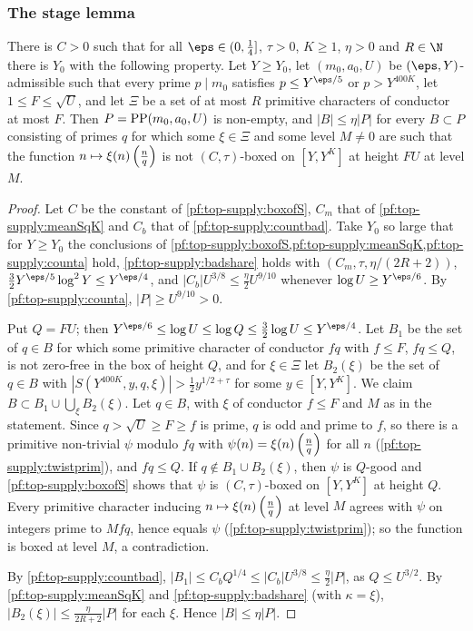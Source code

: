 \subsubsection{The stage lemma}

\begin{proposition}\label{pf:top-supply:stage}
There is $C>0$ such that for all $\eps\in(0,\frac14]$, $\tau>0$, $K\ge1$, $\eta>0$ and $R\in\N$ there is $Y_0$ with the
following property. Let $Y\ge Y_0$, let $(m_0,a_0,U)$ be $(\eps,Y)$-admissible such that every prime $p\mid m_0$
satisfies $p\le Y^{\eps/5}$ or $p>Y^{400K}$, let $1\le F\le\sqrt U$, and let $\Xi$ be a set of at most $R$ primitive
characters of conductor at most $F$. Then $P=\operatorname{PP}(m_0,a_0,U)$ is non-empty, and $|B|\le\eta|P|$ for every
$B\subset P$ consisting of primes $q$ for which some $\xi\in\Xi$ and some level $M\ne0$ are such that the function
$n\mapsto\xi(n)\left(\frac{n}{q}\right)$ is not $(C,\tau)$-boxed on $[Y,Y^K]$ at height $FU$ at level $M$.
\end{proposition}

\begin{proof}
Let $C$ be the constant of \cref{pf:top-supply:boxofS}, $C_m$ that of \cref{pf:top-supply:meanSqK} and $C_b$ that of
\cref{pf:top-supply:countbad}. Take $Y_0$ so large that for $Y\ge Y_0$ the conclusions of
\cref{pf:top-supply:boxofS,pf:top-supply:meanSqK,pf:top-supply:counta} hold, \cref{pf:top-supply:badshare} holds with
$(C_m,\tau,\eta/(2R+2))$, $\frac32Y^{\eps/5}\log^2Y\le Y^{\eps/4}$, and $|C_b|U^{3/8}\le\frac\eta2U^{9/10}$ whenever
$\log U\ge Y^{\eps/6}$. By \cref{pf:top-supply:counta}, $|P|\ge U^{9/10}>0$.

Put $Q=FU$; then $Y^{\eps/6}\le\log U\le\log Q\le\frac32\log U\le Y^{\eps/4}$. Let $B_1$ be the set of $q\in B$ for which
some primitive character of conductor $fq$ with $f\le F$, $fq\le Q$, is not zero-free in the box of height $Q$, and for
$\xi\in\Xi$ let $B_2(\xi)$ be the set of $q\in B$ with $|S(Y^{400K},y,q,\xi)|>\frac12y^{1/2+\tau}$ for some
$y\in[Y,Y^K]$. We claim $B\subset B_1\cup\bigcup_\xi B_2(\xi)$. Let $q\in B$, with $\xi$ of conductor $f\le F$ and $M$ as
in the statement. Since $q>\sqrt U\ge F\ge f$ is prime, $q$ is odd and prime to $f$, so there is a primitive non-trivial
$\psi$ modulo $fq$ with $\psi(n)=\xi(n)\left(\frac{n}{q}\right)$ for all $n$ (\cref{pf:top-supply:twistprim}), and $fq\le Q$. If
$q\notin B_1\cup B_2(\xi)$, then $\psi$ is $Q$-good and \cref{pf:top-supply:boxofS} shows that $\psi$ is
$(C,\tau)$-boxed on $[Y,Y^K]$ at height $Q$. Every primitive character inducing $n\mapsto\xi(n)\left(\frac{n}{q}\right)$ at level $M$
agrees with $\psi$ on integers prime to $Mfq$, hence equals $\psi$ (\cref{pf:top-supply:twistprim}); so the function is boxed at
level $M$, a contradiction.

By \cref{pf:top-supply:countbad}, $|B_1|\le C_bQ^{1/4}\le|C_b|U^{3/8}\le\frac\eta2|P|$, as $Q\le U^{3/2}$. By
\cref{pf:top-supply:meanSqK} and \cref{pf:top-supply:badshare} (with $\kappa=\xi$), $|B_2(\xi)|\le\frac\eta{2R+2}|P|$ for
each $\xi$. Hence $|B|\le\eta|P|$.
\end{proof}

